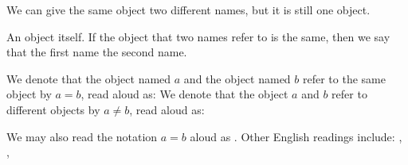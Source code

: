 
\sbasic


\sstart
{}


We can give the
same object two different
names, but it is still
one object.


An object
 itself.
If the object that two
names refer to is
the same,
then we say
that the first name
the second name.


We denote that
the object named $a$ and
the object named $b$ refer
to the same object
by $a = b$,
read aloud as:
We denote that
the object $a$ and
$b$ refer to different
objects by $a \neq b$,
read aloud as:

We may also read the notation
$a = b$ aloud as .
Other English readings
include: ,
,
\strats
